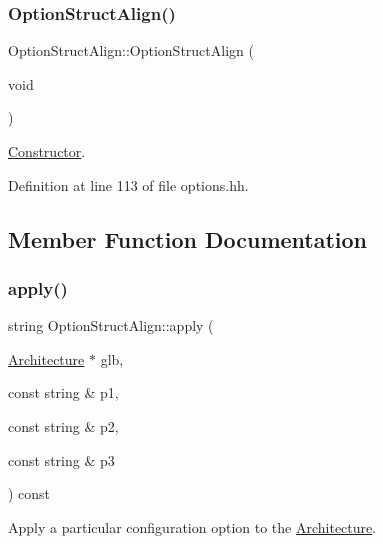 \subsubsection{\texorpdfstring{OptionStructAlign()}{OptionStructAlign()}}
{\footnotesize\ttfamily Option\+Struct\+Align\+::\+Option\+Struct\+Align (\begin{DoxyParamCaption}\item[{void}]{ }\end{DoxyParamCaption})\hspace{0.3cm}{\ttfamily [inline]}}



\mbox{\hyperlink{class_constructor}{Constructor}}. 



Definition at line 113 of file options.\+hh.



\subsection{Member Function Documentation}
\mbox{\label{class_option_struct_align_abe8f802c3e37987b0b5094b4699c20df}} 
\subsubsection{\texorpdfstring{apply()}{apply()}}
{\footnotesize\ttfamily string Option\+Struct\+Align\+::apply (\begin{DoxyParamCaption}\item[{\mbox{\hyperlink{class_architecture}{Architecture}} $\ast$}]{glb,  }\item[{const string \&}]{p1,  }\item[{const string \&}]{p2,  }\item[{const string \&}]{p3 }\end{DoxyParamCaption}) const\hspace{0.3cm}{\ttfamily [virtual]}}



Apply a particular configuration option to the \mbox{\hyperlink{class_architecture}{Architecture}}. 


